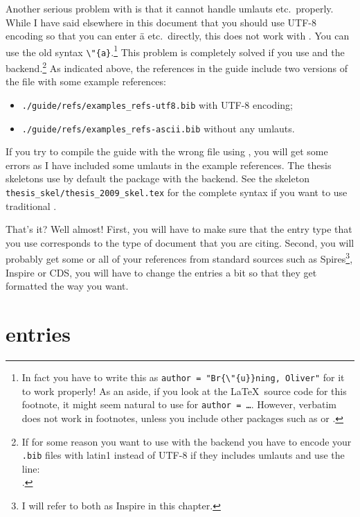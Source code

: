 Another serious problem with \BibTeX{} is that it cannot handle
umlauts etc.\ properly. While I have said elsewhere in this document
that you should use UTF-8 encoding so that you can enter ä
etc.\ directly, this does not work with \BibTeX. You can use the
old syntax \verb+\"{a}+.\footnote{%
  In fact you have to write this as \texttt{author = "Br\{\textbackslash"\{u\}\}ning, Oliver"} for it to work properly! %
  As an aside, if you look at the \LaTeX\ source code for this footnote,
  it might seem natural to use  for \texttt{author = \dots}.
  However, verbatim does not work in footnotes,
  unless you include other packages such as 
   or .}
This problem is completely solved if you use
 and the  backend.\footnote{%
If for some reason you want to use  with the  backend
you have to encode your \texttt{.bib}
files with latin1 instead of UTF-8 if they includes umlauts and use the line:\\
.}
As indicated above, the references in the guide include two versions of the file with some example references:
\begin{itemize}
\setlength{\parskip}{0pt}\setlength{\itemsep}{0pt}
\item \texttt{./guide/refs/examples\_refs-utf8.bib} with UTF-8 encoding;
\item \texttt{./guide/refs/examples\_refs-ascii.bib} without any umlauts.
\end{itemize}
If you try to compile the guide with the wrong file using \BibTeX, you
will get some errors as I have included some umlauts in the example
references.
The thesis skeletons use by default the package  with the  backend.
See the skeleton \texttt{thesis\_skel/thesis\_2009\_skel.tex} for the complete syntax
if you want to use traditional \BibTeX.

That's it? Well almost! First, you will have to make sure that the
entry type that you use corresponds to the type of document that you
are citing. Second, you will probably get some or all of your
references from standard sources such as Spires\footnote{I
  will refer to both as Inspire in this chapter.}, Inspire or CDS, you will have
to change the entries a bit so that they get formatted the way you want.


\section{\BibTeX{} entries}%
\label{sec:ref:bib}

